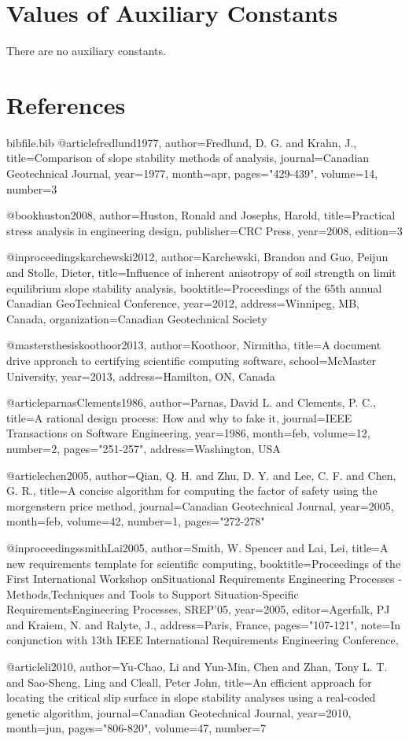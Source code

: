 \documentclass[12pt]{article}
\begin{document}
\section{Values of Auxiliary Constants}
\label{Sec:AuxConstants}
There are no auxiliary constants.
\section{References}
\label{Sec:References}
\begin{filecontents*}{bibfile.bib}
@article{fredlund1977,
author={Fredlund, D. G. and Krahn, J.},
title={Comparison of slope stability methods of analysis},
journal={Canadian Geotechnical Journal},
year={1977},
month={apr},
pages={"429-439"},
volume={14},
number={3}}

@book{huston2008,
author={Huston, Ronald and Josephs, Harold},
title={Practical stress analysis in engineering design},
publisher={CRC Press},
year={2008},
edition={3}}

@inproceedings{karchewski2012,
author={Karchewski, Brandon and Guo, Peijun and Stolle, Dieter},
title={Influence of inherent anisotropy of soil strength on limit equilibrium slope stability analysis},
booktitle={Proceedings of the 65th annual Canadian GeoTechnical Conference},
year={2012},
address={Winnipeg, MB, Canada},
organization={Canadian Geotechnical Society}}

@mastersthesis{koothoor2013,
author={Koothoor, Nirmitha},
title={A document drive approach to certifying scientific computing software},
school={McMaster University},
year={2013},
address={Hamilton, ON, Canada}}

@article{parnasClements1986,
author={Parnas, David L. and Clements, P. C.},
title={A rational design process: How and why to fake it},
journal={IEEE Transactions on Software Engineering},
year={1986},
month={feb},
volume={12},
number={2},
pages={"251-257"},
address={Washington, USA}}

@article{chen2005,
author={Qian, Q. H. and Zhu, D. Y. and Lee, C. F. and Chen, G. R.},
title={A concise algorithm for computing the factor of safety using the morgenstern price method},
journal={Canadian Geotechnical Journal},
year={2005},
month={feb},
volume={42},
number={1},
pages={"272-278"}}

@inproceedings{smithLai2005,
author={Smith, W. Spencer and Lai, Lei},
title={A new requirements template for scientific computing},
booktitle={Proceedings of the First International Workshop onSituational Requirements Engineering Processes - Methods,Techniques and Tools to Support Situation-Specific RequirementsEngineering Processes, SREP'05},
year={2005},
editor={Agerfalk, PJ and Kraiem, N. and Ralyte, J.},
address={Paris, France},
pages={"107-121"},
note={In conjunction with 13th IEEE International Requirements Engineering Conference,}}

@article{li2010,
author={Yu-Chao, Li and Yun-Min, Chen and Zhan, Tony L. T. and Sao-Sheng, Ling and Cleall, Peter John},
title={An efficient approach for locating the critical slip surface in slope stability analyses using a real-coded genetic algorithm},
journal={Canadian Geotechnical Journal},
year={2010},
month={jun},
pages={"806-820"},
volume={47},
number={7}}
\end{filecontents*}
\nocite{*}
\printbibliography[heading=none]
\end{document}
